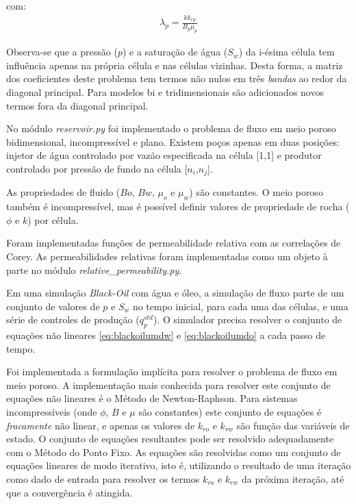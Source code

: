 \documentclass[final,5p]{elsarticle}
\numberwithin{equation}{section}
\begin{document}
        \noindent com:
        \begin{align}
            \lambda_p = \frac{k k_{rp}}{B_p \mu_p} \nonumber
        \end{align}

        Observa-se que a pressão ($p$) e a saturação de água ($S_w$) da i-ésima célula tem influência apenas na própria célula e nas células vizinhas. Desta forma, a matriz dos coeficientes deste problema tem termos não nulos em três \emph{bandas} ao redor da diagonal principal. Para modelos bi e tridimensionais são adicionados novos termos fora da diagonal principal.

        No módulo \emph{reservoir.py} foi implementado o problema de fluxo em meio poroso bidimensional, incompressível e plano. Existem poços apenas em duas posições: injetor de água controlado por vazão especificada na célula [1,1] e produtor controlado por pressão de fundo na célula [$n_i$,$n_j$].

        As propriedades de fluido ($Bo$, $Bw$, $\mu_o$ e $\mu_w$) são constantes. O meio poroso também é incompressível, mas é possível definir valores de propriedade de rocha ($\phi$ e $k$) por célula.

        Foram implementadas funções de permeabilidade relativa com as correlações de Corey\cite{1570009749409873792}. As permeabilidades relativas foram implementadas como um objeto à parte no módulo \emph{relative\_permeability.py}.

        Em uma simulação \emph{Black-Oil} com água e óleo, a simulação de fluxo parte de um conjunto de valores de $p$ e $S_w$ no tempo inicial, para cada uma das células, e uma série de controles de produção ($q^{std}_p$). O simulador precisa resolver o conjunto de equações não lineares \ref{eq:blackoilumdw} e \ref{eq:blackoilumdo} a cada passo de tempo.

        Foi implementada a formulação implícita para resolver o problema de fluxo em meio poroso. A implementação mais conhecida para resolver este conjunto de equações não lineares é o Método de Newton-Raphson. Para sistemas incompressíveis (onde $\phi$, $B$ e $\mu$ são constantes) este conjunto de equações é \emph{fracamente} não linear, e apenas os valores de $k_{ro}$ e $k_{rw}$ são função das variáveis de estado. O conjunto de equações resultantes pode ser resolvido adequadamente com o Método do Ponto Fixo\cite{burden2016analise}. As equações são resolvidas como um conjunto de equações lineares de modo iterativo, isto é, utilizando o resultado de uma iteração como dado de entrada para resolver os termos $k_{ro}$ e $k_{rw}$ da próxima iteração, até que a convergência é atingida.
\end{document}
